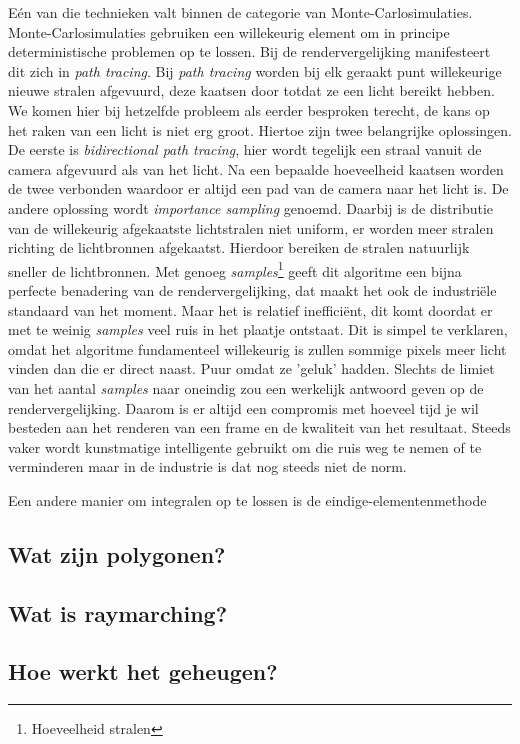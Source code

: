 \documentclass[12pt, a4paper]{article}
\begin{document}
Eén van die technieken valt binnen de categorie van Monte-Carlosimulaties. Monte-Carlosimulaties gebruiken een willekeurig element  om in principe deterministische problemen op te lossen. Bij de rendervergelijking manifesteert dit zich in \emph{path tracing}. Bij \emph{path tracing} worden bij elk geraakt punt willekeurige nieuwe stralen afgevuurd, deze kaatsen door totdat ze een licht bereikt hebben. We komen hier bij hetzelfde probleem als eerder besproken terecht, de kans op het raken van een licht is niet erg groot. Hiertoe zijn twee belangrijke oplossingen. De eerste is \emph{bidirectional path tracing}, hier wordt tegelijk een straal vanuit de camera afgevuurd als van het licht. Na een bepaalde hoeveelheid kaatsen worden de twee verbonden waardoor er altijd een pad van de camera naar het licht is. De andere oplossing wordt \emph{importance sampling} genoemd. Daarbij is de distributie van de willekeurig afgekaatste lichtstralen niet uniform, er worden meer stralen richting de lichtbronnen afgekaatst. Hierdoor bereiken de stralen natuurlijk sneller de lichtbronnen. Met genoeg \emph{samples}\footnote{Hoeveelheid stralen} geeft dit algoritme een bijna perfecte benadering van de rendervergelijking, dat maakt het ook de industriële standaard van het moment. Maar het is relatief inefficiënt, dit komt doordat er met te weinig \emph{samples} veel ruis in het plaatje ontstaat. Dit is simpel te verklaren, omdat het algoritme fundamenteel willekeurig is zullen sommige pixels meer licht vinden dan die er direct naast. Puur omdat ze 'geluk' hadden. Slechts de limiet van het aantal \emph{samples} naar oneindig zou een werkelijk antwoord geven op de rendervergelijking. Daarom is er altijd een compromis met hoeveel tijd je wil besteden aan het renderen van een frame en de kwaliteit van het resultaat. Steeds vaker wordt kunstmatige intelligente gebruikt om die ruis weg te nemen of te verminderen \cite{MonteCarloDenoiser} maar in de industrie is dat nog steeds niet de norm. 

Een andere manier om integralen op te lossen is de eindige-elementenmethode

\subsection{Wat zijn polygonen?}
\subsection{Wat is raymarching?}
\subsection{Hoe werkt het geheugen?}
\clearpage
\end{document}

